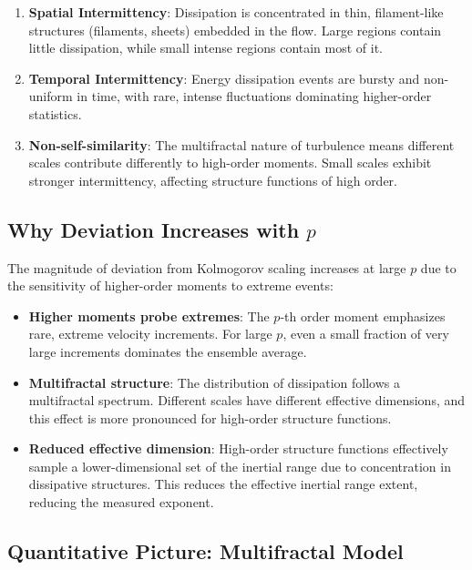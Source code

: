 \documentclass[12pt]{article}
\begin{document}
\begin{enumerate}
    \item \textbf{Spatial Intermittency}: Dissipation is concentrated in thin, filament-like structures (filaments, sheets) embedded in the flow. Large regions contain little dissipation, while small intense regions contain most of it.
    
    \item \textbf{Temporal Intermittency}: Energy dissipation events are bursty and non-uniform in time, with rare, intense fluctuations dominating higher-order statistics.
    
    \item \textbf{Non-self-similarity}: The multifractal nature of turbulence means different scales contribute differently to high-order moments. Small scales exhibit stronger intermittency, affecting structure functions of high order.
\end{enumerate}

\subsection*{Why Deviation Increases with $p$}

The magnitude of deviation from Kolmogorov scaling increases at large $p$ due to the sensitivity of higher-order moments to extreme events:

\begin{itemize}
    \item \textbf{Higher moments probe extremes}: The $p$-th order moment emphasizes rare, extreme velocity increments. For large $p$, even a small fraction of very large increments dominates the ensemble average.
    
    \item \textbf{Multifractal structure}: The distribution of dissipation follows a multifractal spectrum. Different scales have different effective dimensions, and this effect is more pronounced for high-order structure functions.
    
    \item \textbf{Reduced effective dimension}: High-order structure functions effectively sample a lower-dimensional set of the inertial range due to concentration in dissipative structures. This reduces the effective inertial range extent, reducing the measured exponent.
\end{itemize}

\subsection*{Quantitative Picture: Multifractal Model}
\end{document}
